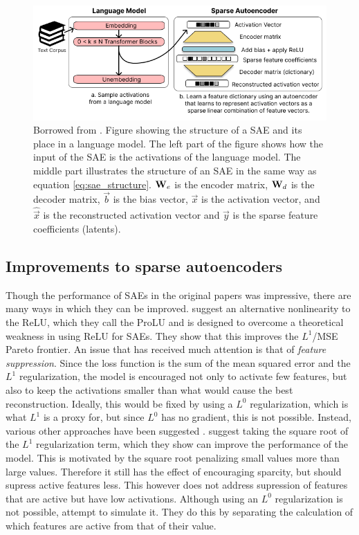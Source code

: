 \begin{figure}[ht]
    \centering
    \includegraphics[width=\textwidth]{images/cunningham_sae_illustration.png}
    \caption{Borrowed from \textcite{cunningham_sparse_2023}. 
    Figure showing the structure of a SAE and its place in a language model.
    The left part of the figure shows how the input of the SAE is the activations of the language model.
    The middle part illustrates the structure of an SAE in the same way as equation \ref{eq:sae_structure}.
    $\mathbf{W}_e$ is the encoder matrix, $\mathbf{W}_d$ is the decoder matrix, $\vec b$ is the bias vector, $\vec x$ is the activation vector, and $\hat{\vec x}$ is the reconstructed activation vector and $\vec y$ is the sparse feature coefficients (latents).
    }
    \label{fig:cunningham_sae_illustration}
\end{figure}

\subsection{Improvements to sparse autoencoders}\label{sec:improvements_to_saes}
Though the performance of SAEs in the original papers \parencite{bricken_towards_2023}\parencite{cunningham_sparse_2023} was impressive, there are many ways in which they can be improved.
\textcite{taggart_prolu_2024} suggest an alternative nonlinearity to the ReLU, which they call the ProLU and is designed to overcome a theoretical weakness in using ReLU for SAEs.
They show that this improves the $L^1$/MSE Pareto frontier.
An issue that has received much attention is that of \emph{feature suppression}.
Since the loss function is the sum of the mean squared error and the $L^1$ regularization, the model is encouraged not only to activate few features, but also to keep the activations smaller than what would cause the best reconstruction.
Ideally, this would be fixed by using a $L^0$ regularization, which is what $L^1$ is a proxy for, but since $L^0$ has no gradient, this is not possible.
Instead, various other approaches have been suggested \parencite{wright_addressing_2024}.
\textcite{riggs_improving_2024} suggest taking the square root of the $L^1$ regularization term, which they show can improve the performance of the model.
This is motivated by the square root penalizing small values more than large values.
Therefore it still has the effect of encouraging sparcity, but should supress active features less.
This however does not address supression of features that are active but have low activations.
Although using an $L^0$ regularization is not possible, \textcite{rajamanoharan_improving_2024} attempt to simulate it.
They do this by separating the calculation of which features are active from that of their value.

